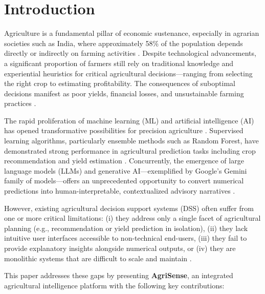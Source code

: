 
\section{Introduction}

Agriculture is a fundamental pillar of economic sustenance, especially in agrarian societies such as India, where approximately 58\% of the population depends directly or indirectly on farming activities \cite{fao2023}. Despite technological advancements, a significant proportion of farmers still rely on traditional knowledge and experiential heuristics for critical agricultural decisions---ranging from selecting the right crop to estimating profitability. The consequences of suboptimal decisions manifest as poor yields, financial losses, and unsustainable farming practices \cite{liakos2018}.

The rapid proliferation of machine learning (ML) and artificial intelligence (AI) has opened transformative possibilities for precision agriculture \cite{kamilaris2018}. Supervised learning algorithms, particularly ensemble methods such as Random Forest, have demonstrated strong performance in agricultural prediction tasks including crop recommendation and yield estimation \cite{chlingaryan2018}. Concurrently, the emergence of large language models (LLMs) and generative AI---exemplified by Google's Gemini family of models---offers an unprecedented opportunity to convert numerical predictions into human-interpretable, contextualized advisory narratives \cite{brown2020}.

However, existing agricultural decision support systems (DSS) often suffer from one or more critical limitations: (i) they address only a single facet of agricultural planning (e.g., recommendation or yield prediction in isolation), (ii) they lack intuitive user interfaces accessible to non-technical end-users, (iii) they fail to provide explanatory insights alongside numerical outputs, or (iv) they are monolithic systems that are difficult to scale and maintain \cite{wolfert2017}.

This paper addresses these gaps by presenting \textbf{AgriSense}, an integrated agricultural intelligence platform with the following key contributions:

